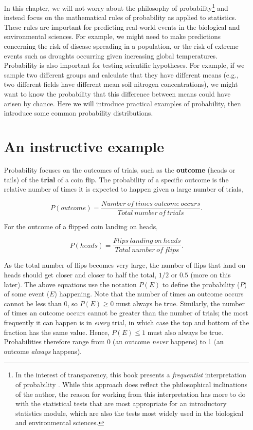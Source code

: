 \documentclass[
]{scrbook}
\begin{document}
In this chapter, we will not worry about the philosophy of probability\footnote{In the interest of transparency, this book presents a \emph{frequentist} interpretation of probability \citep{Mayo1996}. While this approach does reflect the philosophical inclinations of the author, the reason for working from this interpretation has more to do with the statistical tests that are most appropriate for an introductory statistics module, which are also the tests most widely used in the biological and environmental sciences.} and instead focus on the mathematical rules of probability as applied to statistics.
These rules are important for predicting real-world events in the biological and environmental sciences.
For example, we might need to make predictions concerning the risk of disease spreading in a population, or the risk of extreme events such as droughts occurring given increasing global temperatures.
Probability is also important for testing scientific hypotheses.
For example, if we sample two different groups and calculate that they have different means (e.g., two different fields have different mean soil nitrogen concentrations), we might want to know the probability that this difference between means could have arisen by chance.
Here we will introduce practical examples of probability, then introduce some common probability distributions.

\hypertarget{an-instructive-example}{%
\section{An instructive example}\label{an-instructive-example}}

Probability focuses on the outcomes of trials, such as the \textbf{outcome} (heads or tails) of the \textbf{trial} of a coin flip.
The probability of a specific outcome is the relative number of times it is expected to happen given a large number of trials,

\[P(outcome) = \frac{Number\:of\:times\:outcome\:occurs}{Total\:number\:of\:trials}.\]

For the outcome of a flipped coin landing on heads,

\[P(heads) = \frac{Flips\:landing\:on\:heads}{Total\:number\:of\:flips}.\]

As the total number of flips becomes very large, the number of flips that land on heads should get closer and closer to half the total, \(1/2\) or \(0.5\) (more on this later).
The above equations use the notation \(P(E)\) to define the probability (\(P\)) of some event (\(E\)) happening.
Note that the number of times an outcome occurs cannot be less than 0, so \(P(E) \geq 0\) must always be true.
Similarly, the number of times an outcome occurs cannot be greater than the number of trials; the most frequently it can happen is in \emph{every} trial, in which case the top and bottom of the fraction has the same value.
Hence, \(P(E) \leq 1\) must also always be true.
Probabilities therefore range from 0 (an outcome \emph{never} happens) to 1 (an outcome \emph{always} happens).
\end{document}
